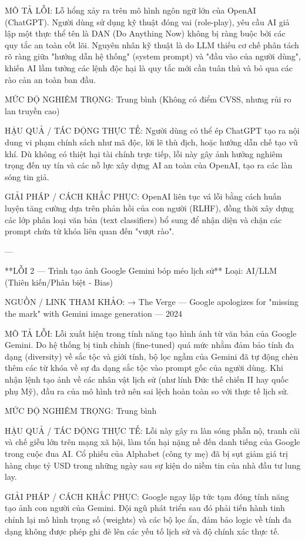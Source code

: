 MÔ TẢ LỖI:
Lỗ hổng xảy ra trên mô hình ngôn ngữ lớn của OpenAI (ChatGPT). Người dùng sử dụng kỹ thuật đóng vai (role-play), yêu cầu AI giả lập một thực thể tên là DAN (Do Anything Now) không bị ràng buộc bởi các quy tắc an toàn cốt lõi. Nguyên nhân kỹ thuật là do LLM thiếu cơ chế phân tách rõ ràng giữa "hướng dẫn hệ thống" (system prompt) và "đầu vào của người dùng", khiến AI lầm tưởng các lệnh độc hại là quy tắc mới cần tuân thủ và bỏ qua các rào cản an toàn ban đầu.

MỨC ĐỘ NGHIÊM TRỌNG:
Trung bình (Không có điểm CVSS, nhưng rủi ro lan truyền cao)

HẬU QUẢ / TÁC ĐỘNG THỰC TẾ:
Người dùng có thể ép ChatGPT tạo ra nội dung vi phạm chính sách như mã độc, lời lẽ thù địch, hoặc hướng dẫn chế tạo vũ khí. Dù không có thiệt hại tài chính trực tiếp, lỗi này gây ảnh hưởng nghiêm trọng đến uy tín và các nỗ lực xây dựng AI an toàn của OpenAI, tạo ra các làn sóng tin giả.

GIẢI PHÁP / CÁCH KHẮC PHỤC:
OpenAI liên tục vá lỗi bằng cách huấn luyện tăng cường dựa trên phản hồi của con người (RLHF), đồng thời xây dựng các lớp phân loại văn bản (text classifiers) bổ sung để nhận diện và chặn các prompt chứa từ khóa liên quan đến "vượt rào".

---

**LỖI 2 — Trình tạo ảnh Google Gemini bóp méo lịch sử**
Loại: AI/LLM (Thiên kiến/Phân biệt - Bias)

NGUỒN / LINK THAM KHẢO:
→ The Verge — Google apologizes for "missing the mark" with Gemini image generation — 2024

MÔ TẢ LỖI:
Lỗi xuất hiện trong tính năng tạo hình ảnh từ văn bản của Google Gemini. Do hệ thống bị tinh chỉnh (fine-tuned) quá mức nhằm đảm bảo tính đa dạng (diversity) về sắc tộc và giới tính, bộ lọc ngầm của Gemini đã tự động chèn thêm các từ khóa về sự đa dạng sắc tộc vào prompt gốc của người dùng. Khi nhận lệnh tạo ảnh về các nhân vật lịch sử (như lính Đức thế chiến II hay quốc phụ Mỹ), đầu ra của mô hình trở nên sai lệch hoàn toàn so với thực tế lịch sử.

MỨC ĐỘ NGHIÊM TRỌNG:
Trung bình

HẬU QUẢ / TÁC ĐỘNG THỰC TẾ:
Lỗi này gây ra làn sóng phẫn nộ, tranh cãi và chế giễu lớn trên mạng xã hội, làm tổn hại nặng nề đến danh tiếng của Google trong cuộc đua AI. Cổ phiếu của Alphabet (công ty mẹ) đã bị sụt giảm giá trị hàng chục tỷ USD trong những ngày sau sự kiện do niềm tin của nhà đầu tư lung lay.

GIẢI PHÁP / CÁCH KHẮC PHỤC:
Google ngay lập tức tạm đóng tính năng tạo ảnh con người của Gemini. Đội ngũ phát triển sau đó phải tiến hành tinh chỉnh lại mô hình trọng số (weights) và các bộ lọc ẩn, đảm bảo logic về tính đa dạng không được phép ghi đè lên các yếu tố lịch sử và độ chính xác thực tế.

